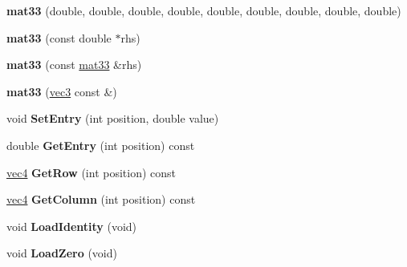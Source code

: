 \begin{DoxyCompactItemize}
\item 
\hypertarget{classmath_1_1mat33_a6abbf85287e3e35c6a01b5320a579a26}{
{\bfseries mat33} (double, double, double, double, double, double, double, double, double)}
\label{classmath_1_1mat33_a6abbf85287e3e35c6a01b5320a579a26}

\item 
\hypertarget{classmath_1_1mat33_aff2a5d2ab9fc74ae270700f5cb208ef4}{
{\bfseries mat33} (const double $\ast$rhs)}
\label{classmath_1_1mat33_aff2a5d2ab9fc74ae270700f5cb208ef4}

\item 
\hypertarget{classmath_1_1mat33_af62b61a10eb3c84a0fb87a3372300222}{
{\bfseries mat33} (const \hyperlink{classmath_1_1mat33}{mat33} \&rhs)}
\label{classmath_1_1mat33_af62b61a10eb3c84a0fb87a3372300222}

\item 
\hypertarget{classmath_1_1mat33_a3d354436f092685cfc00448e1c44225c}{
{\bfseries mat33} (\hyperlink{classmath_1_1vec3}{vec3} const \&)}
\label{classmath_1_1mat33_a3d354436f092685cfc00448e1c44225c}

\item 
\hypertarget{classmath_1_1mat33_aaa68620413d419b5ae1a845e366fa6c3}{
void {\bfseries SetEntry} (int position, double value)}
\label{classmath_1_1mat33_aaa68620413d419b5ae1a845e366fa6c3}

\item 
\hypertarget{classmath_1_1mat33_ab55608e36dc4af2f5eca759dafe008aa}{
double {\bfseries GetEntry} (int position) const }
\label{classmath_1_1mat33_ab55608e36dc4af2f5eca759dafe008aa}

\item 
\hypertarget{classmath_1_1mat33_adc5464a0e20c3879157f4bfeb1255761}{
\hyperlink{classmath_1_1vec4}{vec4} {\bfseries GetRow} (int position) const }
\label{classmath_1_1mat33_adc5464a0e20c3879157f4bfeb1255761}

\item 
\hypertarget{classmath_1_1mat33_ad88f01af243e8619de7ae8d7e0f69730}{
\hyperlink{classmath_1_1vec4}{vec4} {\bfseries GetColumn} (int position) const }
\label{classmath_1_1mat33_ad88f01af243e8619de7ae8d7e0f69730}

\item 
\hypertarget{classmath_1_1mat33_a223a1a66518968317fd3500b69b43744}{
void {\bfseries LoadIdentity} (void)}
\label{classmath_1_1mat33_a223a1a66518968317fd3500b69b43744}

\item 
\hypertarget{classmath_1_1mat33_a7c766e84aa33b1aa82b9eab6bdd1cefd}{
void {\bfseries LoadZero} (void)}
\label{classmath_1_1mat33_a7c766e84aa33b1aa82b9eab6bdd1cefd}


\end{DoxyCompactItemize}
